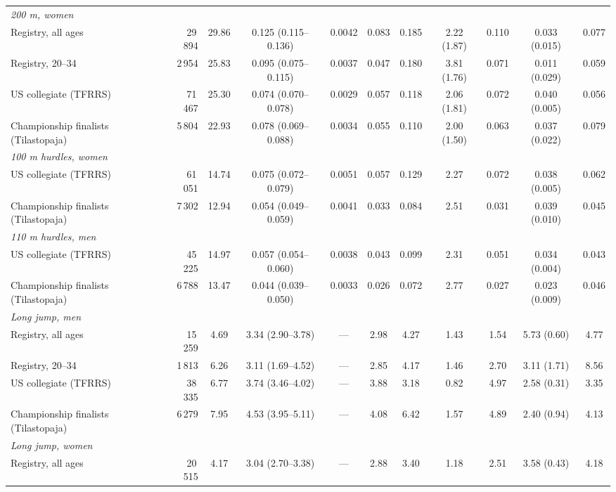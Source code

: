 \begin{tabular}{lrccccccccc}
\multicolumn{11}{l}{\textit{200 m, women}} \\
Registry, all ages & 29\,894 & 29.86 & 0.125 (0.115--0.136) & 0.0042 & 0.083 & 0.185 & 2.22 (1.87) & 0.110 & 0.033 (0.015) & 0.077 \\
Registry, 20--34 & 2\,954 & 25.83 & 0.095 (0.075--0.115) & 0.0037 & 0.047 & 0.180 & 3.81 (1.76) & 0.071 & 0.011 (0.029) & 0.059 \\
US collegiate (TFRRS) & 71\,467 & 25.30 & 0.074 (0.070--0.078) & 0.0029 & 0.057 & 0.118 & 2.06 (1.81) & 0.072 & 0.040 (0.005) & 0.056 \\
Championship finalists (Tilastopaja) & 5\,804 & 22.93 & 0.078 (0.069--0.088) & 0.0034 & 0.055 & 0.110 & 2.00 (1.50) & 0.063 & 0.037 (0.022) & 0.079 \\
\multicolumn{11}{l}{\textit{100 m hurdles, women}} \\
US collegiate (TFRRS) & 61\,051 & 14.74 & 0.075 (0.072--0.079) & 0.0051 & 0.057 & 0.129 & 2.27 & 0.072 & 0.038 (0.005) & 0.062 \\
Championship finalists (Tilastopaja) & 7\,302 & 12.94 & 0.054 (0.049--0.059) & 0.0041 & 0.033 & 0.084 & 2.51 & 0.031 & 0.039 (0.010) & 0.045 \\
\multicolumn{11}{l}{\textit{110 m hurdles, men}} \\
US collegiate (TFRRS) & 45\,225 & 14.97 & 0.057 (0.054--0.060) & 0.0038 & 0.043 & 0.099 & 2.31 & 0.051 & 0.034 (0.004) & 0.043 \\
Championship finalists (Tilastopaja) & 6\,788 & 13.47 & 0.044 (0.039--0.050) & 0.0033 & 0.026 & 0.072 & 2.77 & 0.027 & 0.023 (0.009) & 0.046 \\
\multicolumn{11}{l}{\textit{Long jump, men}} \\
Registry, all ages & 15\,259 & 4.69 & 3.34 (2.90--3.78) & --- & 2.98 & 4.27 & 1.43 & 1.54 & 5.73 (0.60) & 4.77 \\
Registry, 20--34 & 1\,813 & 6.26 & 3.11 (1.69--4.52) & --- & 2.85 & 4.17 & 1.46 & 2.70 & 3.11 (1.71) & 8.56 \\
US collegiate (TFRRS) & 38\,335 & 6.77 & 3.74 (3.46--4.02) & --- & 3.88 & 3.18 & 0.82 & 4.97 & 2.58 (0.31) & 3.35 \\
Championship finalists (Tilastopaja) & 6\,279 & 7.95 & 4.53 (3.95--5.11) & --- & 4.08 & 6.42 & 1.57 & 4.89 & 2.40 (0.94) & 4.13 \\
\multicolumn{11}{l}{\textit{Long jump, women}} \\
Registry, all ages & 20\,515 & 4.17 & 3.04 (2.70--3.38) & --- & 2.88 & 3.40 & 1.18 & 2.51 & 3.58 (0.43) & 4.18 \\

\end{tabular}
